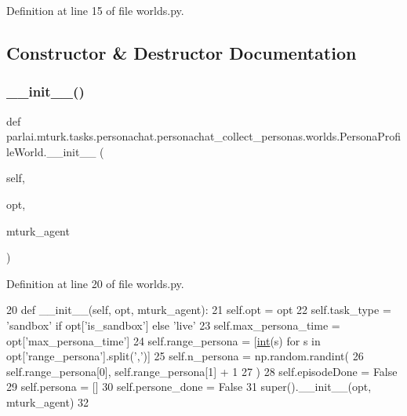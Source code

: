 Definition at line 15 of file worlds.\+py.



\subsection{Constructor \& Destructor Documentation}
\mbox{\label{classparlai_1_1mturk_1_1tasks_1_1personachat_1_1personachat__collect__personas_1_1worlds_1_1PersonaProfileWorld_a262880ba97e26a26e5c2e4e84267bc5c}} 
\subsubsection{\texorpdfstring{\+\_\+\+\_\+init\+\_\+\+\_\+()}{\_\_init\_\_()}}
{\footnotesize\ttfamily def parlai.\+mturk.\+tasks.\+personachat.\+personachat\+\_\+collect\+\_\+personas.\+worlds.\+Persona\+Profile\+World.\+\_\+\+\_\+init\+\_\+\+\_\+ (\begin{DoxyParamCaption}\item[{}]{self,  }\item[{}]{opt,  }\item[{}]{mturk\+\_\+agent }\end{DoxyParamCaption})}



Definition at line 20 of file worlds.\+py.


\begin{DoxyCode}
20     \textcolor{keyword}{def }\_\_init\_\_(self, opt, mturk\_agent):
21         self.opt = opt
22         self.task\_type = \textcolor{stringliteral}{'sandbox'} \textcolor{keywordflow}{if} opt[\textcolor{stringliteral}{'is\_sandbox'}] \textcolor{keywordflow}{else} \textcolor{stringliteral}{'live'}
23         self.max\_persona\_time = opt[\textcolor{stringliteral}{'max\_persona\_time'}]
24         self.range\_persona = [\hyperlink{namespacelanguage__model_1_1eval__ppl_a7d12ee00479673c5c8d1f6d01faa272a}{int}(s) \textcolor{keywordflow}{for} s \textcolor{keywordflow}{in} opt[\textcolor{stringliteral}{'range\_persona'}].split(\textcolor{stringliteral}{','})]
25         self.n\_persona = np.random.randint(
26             self.range\_persona[0], self.range\_persona[1] + 1
27         )
28         self.episodeDone = \textcolor{keyword}{False}
29         self.persona = []
30         self.persone\_done = \textcolor{keyword}{False}
31         super().\_\_init\_\_(opt, mturk\_agent)
32 
\end{DoxyCode}


